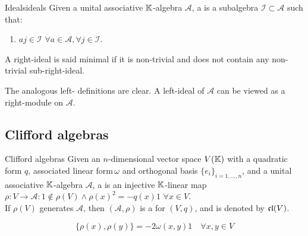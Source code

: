 \begin{definition}{Ideals}{ideals}
  Given a unital associative $ \mathbb{K} $-algebra $ \mathcal{A} $, a  is a subalgebra $ \mathcal{I} \subset \mathcal{A} $ such that: 
  \begin{enumerate}
    \item $ aj \in \mathcal{I} \,\,\forall a \in \mathcal{A} , \forall j \in \mathcal{I} $.
  \end{enumerate}
  A right-ideal is said minimal if it is non-trivial and does not contain any non-trivial sub-right-ideal.
\end{definition}

The analogous left- definitions are clear. A left-ideal of $ \mathcal{A} $ can be viewed as a right-module on $ \mathcal{A} $.


\subsection{Clifford algebras}

\begin{definition}{Clifford algebras}{}
  Given an $ n $-dimensional vector space $ V(\mathbb{K}) $ with a quadratic form $ q $, associated linear form\footnotemark $ \, \omega $ and orthogonal basis $ \{e_i\}_{i = 1,\dots,n} $, and a unital associative $ \mathbb{K} $-algebra $ \mathcal{A} $, a  is an injective $ \mathbb{K} $-linear map $ \rho : V \rightarrow \mathcal{A} : \mathit{1} \notin \rho(V) \land \rho(x)^2 = - q(x) \mathit{1} \,\,\forall x \in V $.\\
  If $ \rho(V) $ generates $ \mathcal{A} $, then $ (\mathcal{A},\rho) $ is a  for $ (V,q) $, and is denoted by $ \mathfrak{cl}(V) $.
\end{definition}
%
%
\begin{lemma}[before upper = {\tcbtitle}]{}{}
  \begin{equation*}
    \{\rho(x) , \rho(y)\} = - 2 \omega(x,y) \mathit{1} \quad \forall x,y \in V
  \end{equation*}
\end{lemma}

